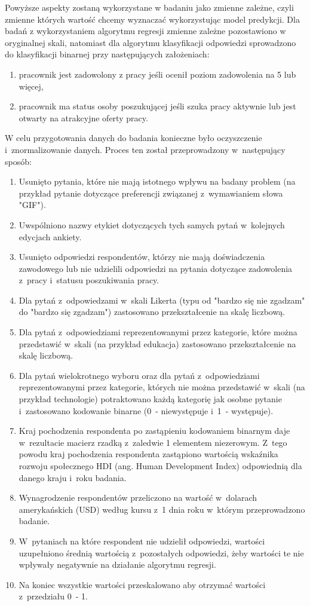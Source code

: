 Powyższe aspekty zostaną wykorzystane w badaniu jako zmienne zależne, czyli zmienne których wartość chcemy wyznaczać wykorzystując model predykcji.
Dla badań z wykorzystaniem algorytmu regresji zmienne zależne pozostawiono w oryginalnej skali,
natomiast dla algorytmu klasyfikacji odpowiedzi sprowadzono do klasyfikacji binarnej przy następujących założeniach:
\begin{enumerate}
    \item pracownik jest zadowolony z pracy jeśli ocenił poziom zadowolenia na 5 lub więcej,
    \item pracownik ma status osoby poszukującej jeśli szuka pracy aktywnie lub jest otwarty na atrakcyjne oferty pracy.
\end{enumerate}

W celu przygotowania danych do badania konieczne było oczyszczenie i~znormalizowanie danych. Proces ten został przeprowadzony w~następujący sposób:
\begin{enumerate}
    \item Usunięto pytania, które nie mają istotnego wpływu na badany problem (na przykład pytanie dotyczące preferencji związanej z~wymawianiem słowa "GIF").
    \item Uwspólniono nazwy etykiet dotyczących tych samych pytań w~kolejnych edycjach ankiety.
    \item Usunięto odpowiedzi respondentów, którzy nie mają doświadczenia zawodowego lub nie udzielili odpowiedzi na pytania dotyczące zadowolenia z~pracy i~statusu poszukiwania pracy.
    \item Dla pytań z~odpowiedzami w~skali Likerta (typu od "bardzo się nie zgadzam" do "bardzo się zgadzam") zastosowano przekształcenie na skalę liczbową.
    \item Dla pytań z~odpowiedziami reprezentowanymi przez kategorie, które można przedstawić w~skali (na przykład edukacja) zastosowano przekształcenie na skalę liczbową.
    \item Dla pytań wielokrotnego wyboru oraz dla pytań z~odpowiedziami reprezentowanymi przez kategorie, których nie można przedstawić w~skali (na przykład technologie) potraktowano każdą kategorię jak osobne pytanie i~zastosowano kodowanie binarne (0~- niewystępuje i~1~- występuje).
    \item Kraj pochodzenia respondenta po zastąpieniu kodowaniem binarnym daje w~rezultacie macierz rzadką z~zaledwie 1 elementem niezerowym. Z~tego powodu kraj pochodzenia respondenta zastąpiono wartością wskaźnika rozwoju społecznego HDI (ang. Human Development Index) \cite{hdi} odpowiednią dla danego kraju i~roku badania.
    \item Wynagrodzenie respondentów przeliczono na wartość w~dolarach amerykańskich (USD) według kursu z~1 dnia roku w~którym przeprowadzono badanie.
    \item W~pytaniach na które respondent nie udzielił odpowiedzi, wartości uzupełniono średnią wartością z~pozostałych odpowiedzi, żeby wartości te nie wpływały negatywnie na działanie algorytmu regresji.
    \item Na koniec wszystkie wartości przeskalowano aby otrzymać wartości z~przedziału 0~- 1.
\end{enumerate}


